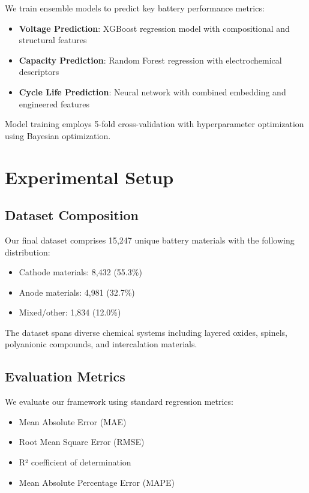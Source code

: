 \documentclass{article}
\begin{document}
We train ensemble models to predict key battery performance metrics:

\begin{itemize}
\item \textbf{Voltage Prediction}: XGBoost regression model with compositional and structural features
\item \textbf{Capacity Prediction}: Random Forest regression with electrochemical descriptors
\item \textbf{Cycle Life Prediction}: Neural network with combined embedding and engineered features
\end{itemize}

Model training employs 5-fold cross-validation with hyperparameter optimization using Bayesian optimization.

\section{Experimental Setup}

\subsection{Dataset Composition}

Our final dataset comprises 15,247 unique battery materials with the following distribution:
\begin{itemize}
\item Cathode materials: 8,432 (55.3\%)
\item Anode materials: 4,981 (32.7\%)
\item Mixed/other: 1,834 (12.0\%)
\end{itemize}

The dataset spans diverse chemical systems including layered oxides, spinels, polyanionic compounds, and intercalation materials.

\subsection{Evaluation Metrics}

We evaluate our framework using standard regression metrics:
\begin{itemize}
\item Mean Absolute Error (MAE)
\item Root Mean Square Error (RMSE)  
\item R² coefficient of determination
\item Mean Absolute Percentage Error (MAPE)
\end{itemize}
\end{document}

